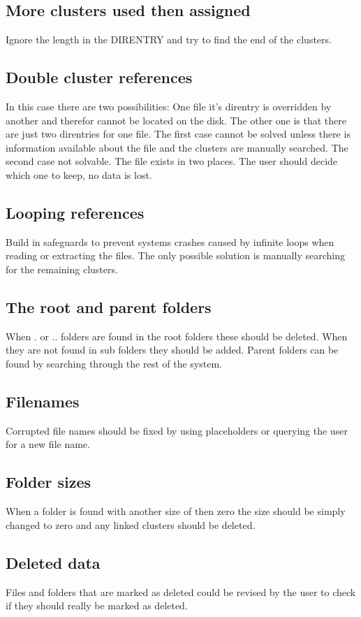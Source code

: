 \documentclass[pdftex,12pt,a4paper]{article}
\begin{document}
\subsection{More clusters used then assigned}
Ignore the length in the DIRENTRY and try to find the end of the clusters.
\subsection{Double cluster references}
In this case there are two possibilities: One file it's direntry is overridden by another and therefor cannot be located on the disk. The other one is that there are just two direntries for one file. The first case cannot be solved unless there is information available about the file and the clusters are manually searched. The second case not solvable. The file exists in two places. The user should decide which one to keep, no data is lost.
\subsection{Looping references}
Build in safeguards to prevent systems crashes caused by infinite loops when reading or extracting the files. The only possible solution is manually searching for the remaining clusters.
\subsection{The root and parent folders}
When . or .. folders are found in the root folders these should be deleted. When they are not found in sub folders they should be added. Parent folders can be found by searching through the rest of the system.
\subsection{Filenames}
Corrupted file names should be fixed by using placeholders or querying the user for a new file name.
\subsection{Folder sizes}
When a folder is found with another size of then zero the size should be simply changed to zero and any linked clusters should be deleted.
\subsection{Deleted data}
Files and folders that are marked as deleted could be revised by the user to check if they should really be marked as deleted.
\end{document}
